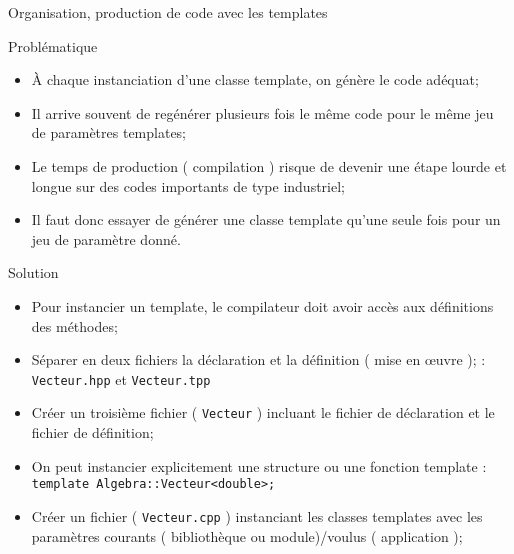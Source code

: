\documentclass[handout,10pt]{beamer}
\begin{document}
\begin{frame}[fragile]{Organisation, production de code avec les templates}
\tiny
\begin{block}{Problématique}
\begin{itemize}
\item À chaque instanciation d'une classe template, on génère le code adéquat;
\item Il arrive souvent de regénérer plusieurs fois le même code pour le même jeu de paramètres templates;
\item Le temps de production ( compilation ) risque de devenir une étape lourde et longue sur des codes importants de type industriel;
\item Il faut donc essayer de générer une classe template qu'une seule fois pour un jeu de paramètre donné.
\end{itemize}
\end{block}

\begin{exampleblock}{Solution}
\begin{itemize}
\item Pour instancier un template, le compilateur doit avoir accès aux définitions des méthodes;
\item {\color{blue}Séparer en deux fichiers la déclaration et la définition ( mise en {\oe}uvre ); : \lstinline$Vecteur.hpp$ et \lstinline$Vecteur.tpp$}
\item {\color{red}Créer un troisième fichier ( \lstinline$Vecteur$ ) incluant le fichier de déclaration et le fichier de définition};
\item On peut instancier explicitement une structure ou une fonction template : \lstinline$template Algebra::Vecteur<double>;$
\item {\color{blue}Créer un fichier ( \lstinline$Vecteur.cpp$ ) instanciant les classes templates avec les paramètres courants ( bibliothèque ou module)/voulus ( application )};
\end{itemize}
\end{exampleblock}
\end{frame}
\end{document}

